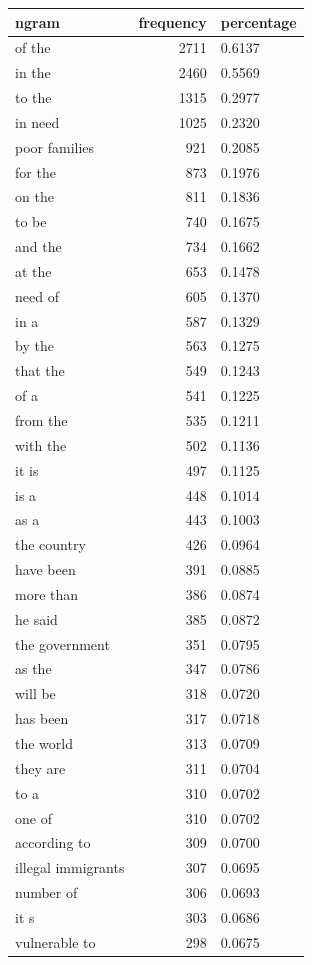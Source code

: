 \begin{tabular}{lrl}
\toprule
ngram & frequency & percentage \\
\midrule
of the & 2711 & 0.6137 \\
in the & 2460 & 0.5569 \\
to the & 1315 & 0.2977 \\
in need & 1025 & 0.2320 \\
poor families & 921 & 0.2085 \\
for the & 873 & 0.1976 \\
on the & 811 & 0.1836 \\
to be & 740 & 0.1675 \\
and the & 734 & 0.1662 \\
at the & 653 & 0.1478 \\
need of & 605 & 0.1370 \\
in a & 587 & 0.1329 \\
by the & 563 & 0.1275 \\
that the & 549 & 0.1243 \\
of a & 541 & 0.1225 \\
from the & 535 & 0.1211 \\
with the & 502 & 0.1136 \\
it is & 497 & 0.1125 \\
is a & 448 & 0.1014 \\
as a & 443 & 0.1003 \\
the country & 426 & 0.0964 \\
have been & 391 & 0.0885 \\
more than & 386 & 0.0874 \\
he said & 385 & 0.0872 \\
the government & 351 & 0.0795 \\
as the & 347 & 0.0786 \\
will be & 318 & 0.0720 \\
has been & 317 & 0.0718 \\
the world & 313 & 0.0709 \\
they are & 311 & 0.0704 \\
to a & 310 & 0.0702 \\
one of & 310 & 0.0702 \\
according to & 309 & 0.0700 \\
illegal immigrants & 307 & 0.0695 \\
number of & 306 & 0.0693 \\
it s & 303 & 0.0686 \\
vulnerable to & 298 & 0.0675 \\

\end{tabular}
